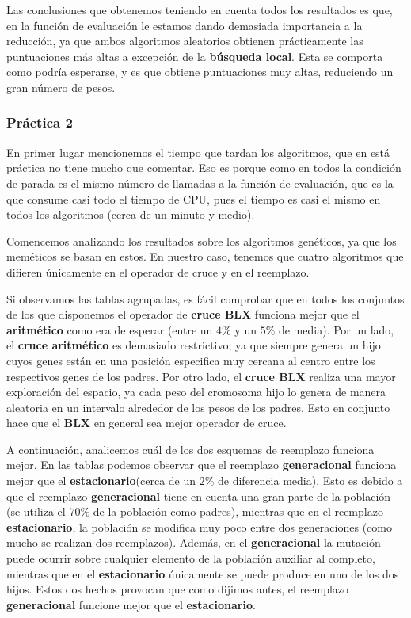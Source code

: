 \documentclass[size=a4, parskip=half, titlepage=false, toc=flat, toc=bib, 12pt]{scrartcl}
\begin{document}
Las conclusiones que obtenemos teniendo en cuenta todos los resultados es que, en la función de evaluación le estamos dando demasiada importancia a la reducción, ya que ambos algoritmos aleatorios obtienen prácticamente las puntuaciones más altas a excepción de la \textbf{búsqueda local}. Esta se comporta como podría esperarse, y es que obtiene puntuaciones muy altas, reduciendo un gran número de pesos.

\subsubsection{Práctica 2}
En primer lugar mencionemos el tiempo que tardan los algoritmos, que en está práctica no tiene mucho que comentar. Eso es porque como en todos la condición de parada es el mismo número de llamadas a la función de evaluación, que es la que consume casi todo el tiempo de CPU, pues el tiempo es casi el mismo en todos los algoritmos (cerca de un minuto y medio).

Comencemos analizando los resultados sobre los algoritmos genéticos, ya que los meméticos se basan en estos. En nuestro caso, tenemos que cuatro algoritmos que difieren únicamente en el operador de cruce y en el reemplazo.

Si observamos las tablas agrupadas, es fácil comprobar que en todos los conjuntos de los que disponemos el operador de \textbf{cruce BLX} funciona mejor que el \textbf{aritmético} como era de esperar (entre un $4\%$ y un  $5\%$ de media). Por un lado, el \textbf{cruce aritmético} es demasiado restrictivo, ya que siempre genera un hijo cuyos genes están en una posición especifica muy cercana al centro entre los respectivos genes de los padres. Por otro lado, el \textbf{cruce BLX} realiza una mayor exploración del espacio, ya cada peso del cromosoma hijo lo genera de manera aleatoria en un intervalo alrededor de los pesos de los padres. Esto en conjunto hace que el \textbf{BLX} en general sea mejor operador de cruce.

A continuación, analicemos cuál de los dos esquemas de reemplazo funciona mejor. En las tablas podemos observar que el reemplazo \textbf{generacional} funciona mejor que el \textbf{estacionario}(cerca de un $2\%$ de diferencia media). Esto es debido a que el reemplazo \textbf{generacional} tiene en cuenta una gran parte de la población (se utiliza el $70\%$ de la población como padres), mientras que en el reemplazo \textbf{estacionario}, la población se modifica muy poco entre dos generaciones (como mucho se realizan dos reemplazos). Además, en el \textbf{generacional} la mutación puede ocurrir sobre cualquier elemento de la población auxiliar al completo, mientras que en el \textbf{estacionario} únicamente se puede produce en uno de los dos hijos. Estos dos hechos provocan que como dijimos antes, el reemplazo \textbf{generacional} funcione mejor que el \textbf{estacionario}.
\end{document}
